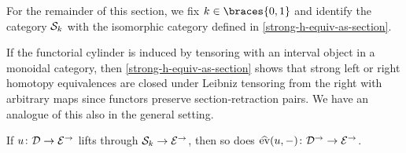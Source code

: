 \documentclass[reqno,10pt,a4paper,oneside,draft]{amsart}
\begin{document}
For the remainder of this section, we fix $k \in \braces{0, 1}$ and identify the category $\cal{S}_k$ with the isomorphic category defined in \cref{strong-h-equiv-as-section}.

If the functorial cylinder is induced by tensoring with an interval object in a monoidal category, then \cref{strong-h-equiv-as-section} shows that strong left or right homotopy equivalences are closed under Leibniz tensoring from the right with arbitrary maps since functors preserve section-retraction pairs.
We have an analogue of this also in the general setting.

\begin{lemma} \label{leibniz-lift}
If $u \co \cal{D} \to \catE^\to$ lifts through $\cal{S}_k \to \catE^\to$, then so does $\hateval(u, -) \co \cal{D}^\to \to \catE^\to$.
\end{lemma}
\end{document}
